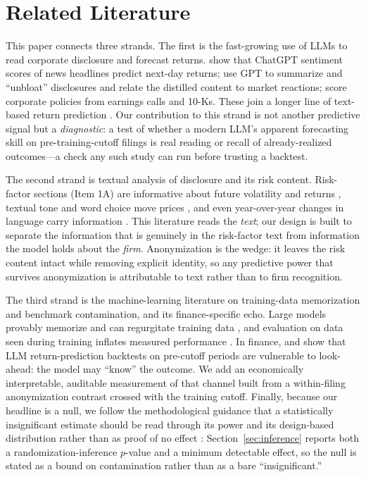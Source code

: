 \documentclass[12pt]{article}
\begin{document}
\section{Related Literature}\label{sec:lit}
This paper connects three strands. The first is the fast-growing use of LLMs to read
corporate disclosure and forecast returns. \citet{lopezlira2023} show that ChatGPT sentiment
scores of news headlines predict next-day returns; \citet{kim2024} use GPT to summarize and
``unbloat'' disclosures and relate the distilled content to market reactions;
\citet{jha2024} score corporate policies from earnings calls and 10-Ks. These join a longer
line of text-based return prediction \citep{kelly2019,hansen2023,tetlock2007}. Our
contribution to this strand is not another predictive signal but a \emph{diagnostic}: a test
of whether a modern LLM's apparent forecasting skill on pre-training-cutoff filings is real
reading or recall of already-realized outcomes---a check any such study can run before
trusting a backtest.

The second strand is textual analysis of disclosure and its risk content. Risk-factor
sections (Item 1A) are informative about future volatility and returns
\citep{campbell2014,kravet2013}, textual tone and word choice move prices
\citep{loughran2011,tetlock2007}, and even year-over-year changes in language carry
information \citep{cohen2020}. This literature reads the \emph{text}; our design is built to
separate the information that is genuinely in the risk-factor text from information the model
holds about the \emph{firm}. Anonymization is the wedge: it leaves the risk content intact
while removing explicit identity, so any predictive power that survives anonymization is
attributable to text rather than to firm recognition.

The third strand is the machine-learning literature on training-data memorization and
benchmark contamination, and its finance-specific echo. Large models provably memorize and
can regurgitate training data \citep{carlini2021}, and evaluation on data seen during
training inflates measured performance \citep{magar2022,sainz2023}. In finance,
\citet{glasserman2023} and \citet{sarkar2024} show that LLM return-prediction backtests on
pre-cutoff periods are vulnerable to look-ahead: the model may ``know'' the outcome. We add
an economically interpretable, auditable measurement of that channel built from a
within-filing anonymization contrast crossed with the training cutoff. Finally, because our
headline is a null, we follow the methodological guidance that a statistically insignificant
estimate should be read through its power and its design-based distribution rather than as
proof of no effect \citep{abadie2020,young2019}: Section~\ref{sec:inference} reports both a
randomization-inference $p$-value and a minimum detectable effect, so the null is stated as a
bound on contamination rather than as a bare ``insignificant.''
\end{document}
